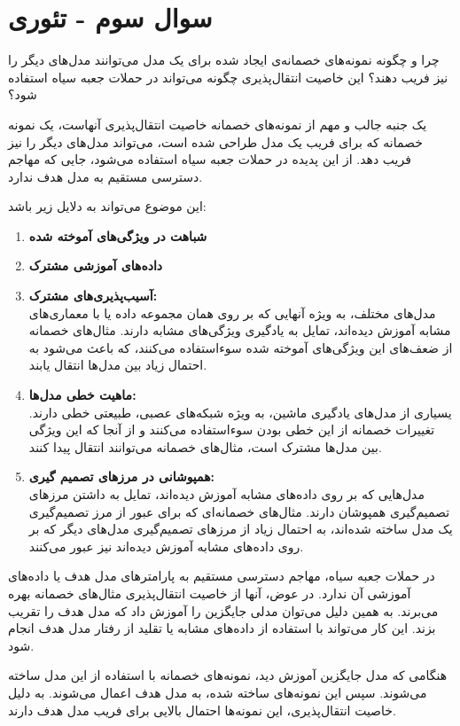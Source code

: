 \section{سوال سوم - تئوری}
چرا و چگونه نمونه‌های خصمانه‌ی ایجاد شده برای یک مدل می‌توانند مدل‌های دیگر را نیز فریب دهند؟ این خاصیت انتقال‌پذیری چگونه می‌تواند در حملات جعبه سیاه استفاده شود؟


\begin{qsolve}
یک جنبه جالب و مهم از نمونه‌های خصمانه خاصیت انتقال‌پذیری آنهاست، یک نمونه خصمانه که برای فریب یک مدل طراحی شده است، می‌تواند مدل‌های دیگر را نیز فریب دهد. از این پدیده در حملات جعبه سیاه استفاده می‌شود، جایی که مهاجم دسترسی مستقیم به مدل هدف ندارد.

این موضوع می‌تواند به دلایل زیر باشد:

\begin{enumerate}
	\item \textbf{شباهت در ویژگی‌های آموخته شده}
	
	\item \textbf{داده‌های آموزشی مشترک}
	
	\item \textbf{آسیب‌پذیری‌های مشترک:}\\
مدل‌های مختلف، به ویژه آنهایی که بر روی همان مجموعه داده یا با معماری‌های مشابه آموزش دیده‌اند، تمایل به یادگیری ویژگی‌های مشابه دارند. مثال‌های خصمانه از ضعف‌های این ویژگی‌های آموخته شده سوءاستفاده می‌کنند، که باعث می‌شود به احتمال زیاد بین مدل‌ها انتقال یابند.

	\item \textbf{ماهیت خطی مدل‌ها:}\\
یسیاری از مدل‌های یادگیری ماشین، به ویژه شبکه‌های عصبی، طبیعتی خطی دارند. تغییرات خصمانه از این خطی بودن سوءاستفاده می‌کنند و از آنجا که این ویژگی بین مدل‌ها مشترک است، مثال‌های خصمانه می‌توانند انتقال پیدا کنند.

	\item \textbf{همپوشانی در مرز‌های تصمیم گیری:}\\
مدل‌هایی که بر روی داده‌های مشابه آموزش دیده‌اند، تمایل به داشتن مرزهای تصمیم‌گیری همپوشان دارند. مثال‌های خصمانه‌ای که برای عبور از مرز تصمیم‌گیری یک مدل ساخته شده‌اند، به احتمال زیاد از مرزهای تصمیم‌گیری مدل‌های دیگر که بر روی داده‌های مشابه آموزش دیده‌اند نیز عبور می‌کنند.
\end{enumerate}

در حملات جعبه سیاه، مهاجم دسترسی مستقیم به پارامترهای مدل هدف یا داده‌های آموزشی آن ندارد. در عوض، آنها از خاصیت انتقال‌پذیری مثال‌های خصمانه بهره می‌برند. به همین دلیل می‌توان مدلی جایگزین را آموزش داد که مدل هدف را تقریب بزند. این کار می‌تواند با استفاده از داده‌های مشابه یا تقلید از رفتار مدل هدف انجام شود.

هنگامی که مدل جایگزین آموزش دید، نمونه‌های خصمانه با استفاده از این مدل ساخته می‌شوند. سپس این نمونه‌های ساخته شده، به مدل هدف اعمال می‌شوند. به دلیل خاصیت انتقال‌پذیری، این نمونه‌ها احتمال بالایی برای فریب مدل هدف دارند.



\end{qsolve}